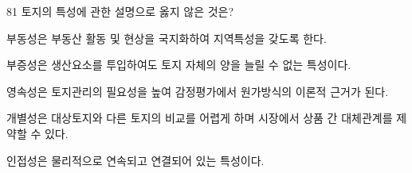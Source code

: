 \begin{question}{81}
토지의 특성에 관한 설명으로 옳지 않은 것은?
\begin{choices}
  \item 부동성은 부동산 활동 및 현상을 국지화하여 지역특성을 갖도록 한다.
  \item 부증성은 생산요소를 투입하여도 토지 자체의 양을 늘릴 수 없는 특성이다.
  \item 영속성은 토지관리의 필요성을 높여 감정평가에서 원가방식의 이론적 근거가 된다.
  \item 개별성은 대상토지와 다른 토지의 비교를 어렵게 하며 시장에서 상품 간 대체관계를 제약할 수 있다.
  \item 인접성은 물리적으로 연속되고 연결되어 있는 특성이다.
\end{choices}
\end{question}
